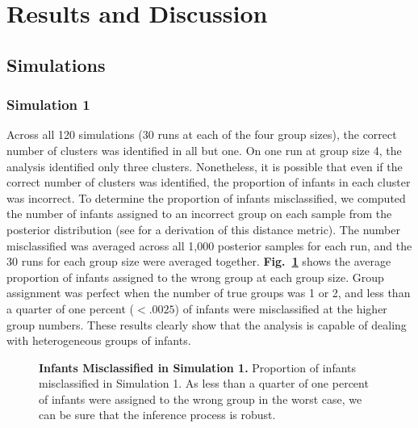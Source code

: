 \documentclass[12pt]{article}
\begin{document}
\section*{Results and Discussion}

\subsection*{Simulations}

\subsubsection*{Simulation 1}

	Across all 120 simulations (30 runs at each of the four group sizes), the correct number of clusters was identified in all but one. On one run at group size 4, the analysis identified only three clusters. Nonetheless, it is possible that even if the correct number of clusters was identified, the proportion of infants in each cluster was incorrect. To determine the proportion of infants misclassified, we computed the number of infants assigned to an incorrect group on each sample from the posterior distribution (see \cite{Cha2002} for a derivation of this distance metric). The number misclassified was averaged across all 1,000 posterior samples for each run, and the 30 runs for each group size were averaged together. \textbf{Fig.~\ref{fig:sim1}} shows the average proportion of infants assigned to the wrong group at each group size. Group assignment was perfect when the number of true groups was 1 or 2, and less than a quarter of one percent ($< .0025$) of infants were misclassified at the higher group numbers. These results clearly show that the analysis is capable of dealing with heterogeneous groups of infants.

\begin{figure}[!h]
\caption{\textbf{Infants Misclassified in Simulation 1.} Proportion of infants misclassified in Simulation 1. As less than a quarter of one percent of infants were assigned to the wrong group in the worst case, we can be sure that the inference process is robust.}
\label{fig:sim1}
\end{figure}
\end{document}
